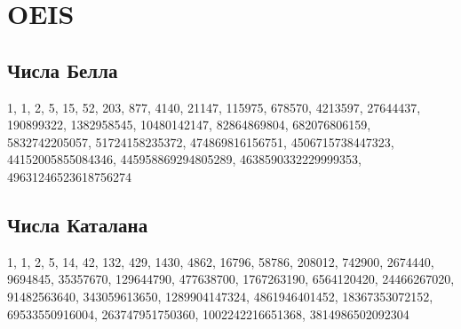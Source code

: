 \section{OEIS}

\subsection{Числа Белла}

1, 1, 2, 5, 15, 52, 203, 877, 4140, 21147, 115975, 678570, 4213597, 27644437, 190899322, 1382958545, 10480142147, 82864869804, 682076806159, 5832742205057, 51724158235372, 474869816156751, 4506715738447323, 44152005855084346, 445958869294805289, 4638590332229999353, 49631246523618756274

\subsection{Числа Каталана}

1, 1, 2, 5, 14, 42, 132, 429, 1430, 4862, 16796, 58786, 208012, 742900, 2674440, 9694845, 35357670, 129644790, 477638700, 1767263190, 6564120420, 24466267020, 91482563640, 343059613650, 1289904147324, 4861946401452, 18367353072152, 69533550916004, 263747951750360, 1002242216651368, 3814986502092304
